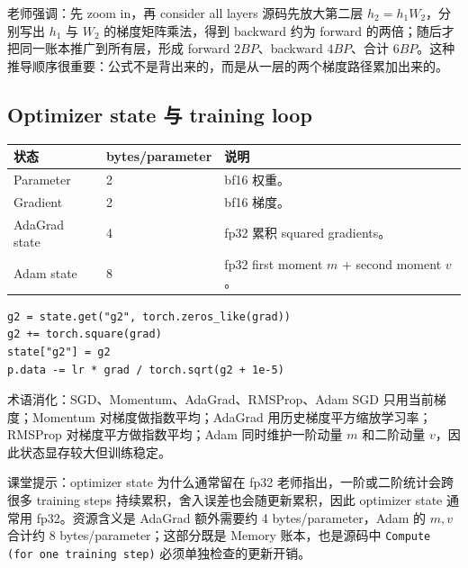 \begin{knowledgebox}{老师强调：先 zoom in，再 consider all layers}
源码先放大第二层 \(h_2=h_1W_2\)，分别写出 \(h_1\) 与 \(W_2\) 的梯度矩阵乘法，得到 backward 约为 forward 的两倍；随后才把同一账本推广到所有层，形成 forward \(2BP\)、backward \(4BP\)、合计 \(6BP\)。这种推导顺序很重要：公式不是背出来的，而是从一层的两个梯度路径累加出来的。
\end{knowledgebox}

\subsection{Optimizer state 与 training loop}

\begin{longtable}{p{}p{}p{}}
\toprule
\textbf{状态} & \textbf{bytes/parameter} & \textbf{说明} \\
\midrule
Parameter & 2 & bf16 权重。 \\
Gradient & 2 & bf16 梯度。 \\
AdaGrad state & 4 & fp32 累积 squared gradients。 \\
Adam state & 8 & fp32 first moment \(m\) + second moment \(v\)。 \\
\bottomrule
\end{longtable}

\begin{lstlisting}[caption={AdaGrad optimizer 的核心状态}]
g2 = state.get("g2", torch.zeros_like(grad))
g2 += torch.square(grad)
state["g2"] = g2
p.data -= lr * grad / torch.sqrt(g2 + 1e-5)
\end{lstlisting}

\begin{knowledgebox}{术语消化：SGD、Momentum、AdaGrad、RMSProp、Adam}
SGD 只用当前梯度；Momentum 对梯度做指数平均；AdaGrad 用历史梯度平方缩放学习率；RMSProp 对梯度平方做指数平均；Adam 同时维护一阶动量 \(m\) 和二阶动量 \(v\)，因此状态显存较大但训练稳定。
\end{knowledgebox}

\begin{knowledgebox}{课堂提示：optimizer state 为什么通常留在 fp32}
老师指出，一阶或二阶统计会跨很多 training steps 持续累积，舍入误差也会随更新累积，因此 optimizer state 通常用 fp32。资源含义是 AdaGrad 额外需要约 4 bytes/parameter，Adam 的 \(m,v\) 合计约 8 bytes/parameter；这部分既是 Memory 账本，也是源码中 \texttt{Compute (for one training step)} 必须单独检查的更新开销。
\end{knowledgebox}

